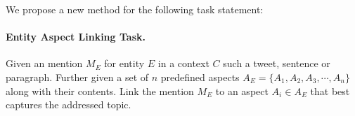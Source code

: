 


\noindent We propose a new method for the following task statement:
\paragraph{\textbf{Entity Aspect Linking Task.}} Given an mention $M_E$ for entity $E$ in a context $C$ such a tweet, sentence or paragraph. Further given a set of $n$ predefined aspects $A_{E} = \{A_1, A_2, A_3, \cdots, A_n\}$ along with their contents. Link the mention $M_E$ to an aspect $A_i \in A_{E}$ that best captures the addressed topic. 

